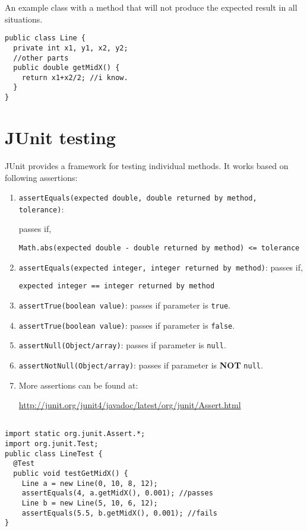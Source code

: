 An example class with a method that will not produce the expected result in all situations.
  \begin{lstlisting}[frame=single,style=buggy]
public class Line {
  private int x1, y1, x2, y2;
  //other parts
  public double getMidX() {
    return x1+x2/2; //i know.
  }
}
  \end{lstlisting}    


\section{JUnit testing}
  JUnit provides a framework for testing individual methods. It works based on following assertions:
  
\begin{enumerate}
  \item \texttt{assertEquals(expected double, double returned by method, tolerance)}: 

passes if,

\begin{verbatim}
Math.abs(expected double - double returned by method) <= tolerance
\end{verbatim}

  \item \texttt{assertEquals(expected integer, integer returned by method)}: passes if,

\begin{verbatim}
expected integer == integer returned by method
\end{verbatim}

  \item \texttt{assertTrue(boolean value)}: passes if parameter is \texttt{true}.
  \item \texttt{assertTrue(boolean value)}: passes if parameter is \texttt{false}.
  \item \texttt{assertNull(Object/array)}: passes if parameter is \texttt{null}.
  \item \texttt{assertNotNull(Object/array)}: passes if parameter is \textbf{NOT} \texttt{null}.
  \item More assertions can be found at: 

\href{http://junit.org/junit4/javadoc/latest/org/junit/Assert.html}{http://junit.org/junit4/javadoc/latest/org/junit/Assert.html}

\end{enumerate}
  
\begin{lstlisting}[style=junit]

import static org.junit.Assert.*;
import org.junit.Test;
public class LineTest {
  @Test
  public void testGetMidX() {
    Line a = new Line(0, 10, 8, 12);
    assertEquals(4, a.getMidX(), 0.001); //passes
    Line b = new Line(5, 10, 6, 12);
    assertEquals(5.5, b.getMidX(), 0.001); //fails
}
\end{lstlisting}    

